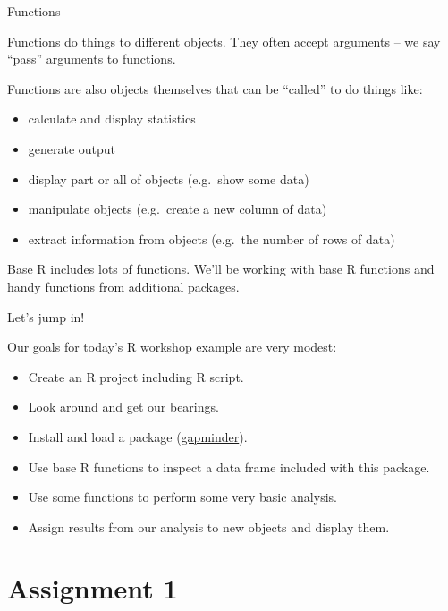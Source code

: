 \documentclass[8pt,ignorenonframetext,dvipsnames]{beamer}
\providecommand{\tightlist}{%
  \setlength{\itemsep}{0pt}\setlength{\parskip}{0pt}}
\let\olditem\item
\renewcommand{\item}{%
  \olditem\vspace{4pt}
}
\begin{document}
\begin{frame}{Functions}
\protect\hypertarget{functions}{}

Functions do things to different objects. They often accept arguments --
we say ``pass'' arguments to functions.

Functions are also objects themselves that can be ``called'' to do
things like:

\begin{itemize}
\tightlist
\item
  calculate and display statistics
\item
  generate output
\item
  display part or all of objects (e.g.~show some data)
\item
  manipulate objects (e.g.~create a new column of data)
\item
  extract information from objects (e.g.~the number of rows of data)
\end{itemize}

Base R includes lots of functions. We'll be working with base R
functions and handy functions from additional packages.

\end{frame}

\begin{frame}{Let's jump in!}
\protect\hypertarget{lets-jump-in}{}

Our goals for today's R workshop example are very modest:

\begin{itemize}
\tightlist
\item
  Create an R project including R script.
\item
  Look around and get our bearings.
\item
  Install and load a package
  (\href{https://www.gapminder.org/}{gapminder}).
\item
  Use base R functions to inspect a data frame included with this
  package.
\item
  Use some functions to perform some very basic analysis.
\item
  Assign results from our analysis to new objects and display them.
\end{itemize}

\end{frame}

\hypertarget{assignment-1}{%
\section{Assignment 1}\label{assignment-1}}
\end{document}
